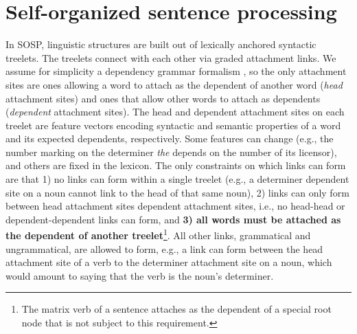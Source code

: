 \documentclass[10pt,letterpaper]{article}
\begin{document}
\section{Self-organized sentence processing}

In SOSP, linguistic structures are built out of lexically anchored syntactic treelets. The treelets connect with each other via graded attachment links. We assume for simplicity a dependency grammar formalism \cite{hudson2007language, mcdonald2013universal}, so the only attachment sites are ones allowing a word to attach as the dependent of another word (\emph{head} attachment sites) and ones that allow other words to attach as dependents (\emph{dependent} attachment sites). The head and dependent attachment sites on each treelet are feature vectors encoding syntactic and semantic properties of a word and its expected dependents, respectively. Some features can change (e.g., the number marking on the determiner \emph{the} depends on the number of its licensor), and others are fixed in the lexicon. The only constraints on which links can form are that 1) no links can form within a single treelet (e.g., a determiner dependent site on a noun cannot link to the head of that same noun), 2) links can only form between head attachment sites dependent attachment sites, i.e., no head-head or dependent-dependent links can form, and \textbf{3) all words must be attached as the dependent of another treelet}\footnote{The matrix verb of a sentence attaches as the dependent of a special root node that is not subject to this requirement.}. All other links, grammatical and ungrammatical, are allowed to form, e.g., a link can form between the head attachment site of a verb to the determiner attachment site on a noun, which would amount to saying that the verb is the noun's determiner.
\end{document}
